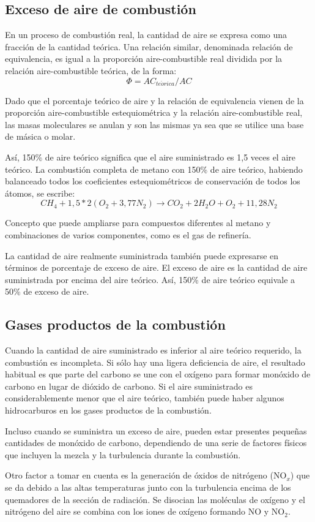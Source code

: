 \subsection{Exceso de aire de combustión}
\par En un proceso de combustión real, la cantidad de aire se expresa como una fracción de la cantidad teórica. Una relación similar, denominada relación de equivalencia, es igual a la proporción aire-combustible real dividida por la relación aire-combustible teórica, de la forma:
\begin{equation}
    \Phi = AC_{te\acute{o}rica}/AC
\end{equation}
\par Dado que el porcentaje teórico de aire y la relación de equivalencia vienen de la proporción aire-combustible estequiométrica y la relación aire-combustible real, las masas moleculares se anulan y son las mismas ya sea que se utilice una base de másica o molar.
\par Así, 150\% de aire teórico significa que el aire suministrado es 1,5 veces el aire teórico. La combustión completa de metano con 150\% de aire teórico, habiendo balanceado todos los coeficientes estequiométricos de conservación de todos los átomos, se escribe:
\begin{equation}
CH_4 + 1,5*2(O_2 + 3,77N_2 ) \rightarrow CO_2 + 2H_2O + O_2 + 11,28N_2
\end{equation}
\par Concepto que puede ampliarse para compuestos diferentes al metano y combinaciones de varios componentes, como es el gas de refinería.
\par La cantidad de aire realmente suministrada también puede expresarse en términos de porcentaje de exceso de aire. El exceso de aire es la cantidad de aire suministrada por encima del aire teórico. Así, 150\% de aire teórico equivale a 50\% de exceso de aire.

\subsection{Gases productos de la combustión}
\par Cuando la cantidad de aire suministrado es inferior al aire teórico requerido, la combustión es incompleta. Si sólo hay una ligera deficiencia de aire, el resultado habitual es que parte del carbono se une con el oxígeno para formar monóxido de carbono en lugar de dióxido de carbono. Si el aire suministrado es considerablemente menor que el aire teórico, también puede haber algunos hidrocarburos en los gases productos de la combustión.
\par Incluso cuando se suministra un exceso de aire, pueden estar presentes pequeñas cantidades de monóxido de carbono, dependiendo de una serie de factores físicos que incluyen la mezcla y la turbulencia durante la combustión. 
\par Otro factor a tomar en cuenta es la generación de óxidos de nitrógeno (NO$_x$) que se da debido a las altas temperaturas junto con la turbulencia encima de los quemadores de la sección de radiación. Se disocian las moléculas de oxígeno y el nitrógeno del aire se combina con los iones de oxígeno formando NO y NO$_2$.

